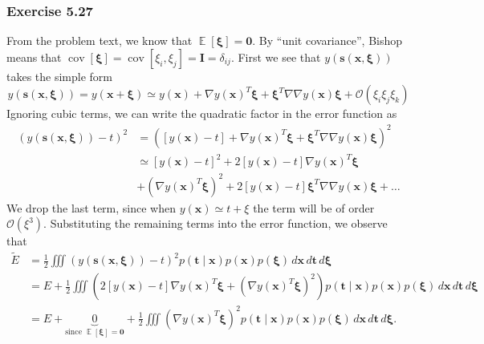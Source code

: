 \documentclass[12pt, a4paper]{article}
\newcommand{\vect}[1]{\bm{#1}}
\DeclareMathOperator{\E}{\mathbb{E}}
\DeclareMathOperator{\cov}{\operatorname{cov}}
\begin{document}
\subsubsection*{Exercise 5.27}
From the problem text, we know that $\E \left[ \vect{\xi}\right] = \vect{0}$.
By ``unit covariance'', Bishop means that $\cov \left[ \vect{\xi}\right] = \cov \left[ \xi_i, \xi_j \right] = \vect{I} =  \delta_{ij}$.
First we see that $y( \vect{s}(\vect{x}, \vect{\xi}) )$ takes the simple form
\begin{equation*}
	y( \vect{s}(\vect{x}, \vect{\xi}) )
	= y( \vect{x} + \vect{\xi} )
	\simeq y( \vect{x}) + \nabla y (\vect{x})^T \vect{\xi}
	+
	\vect{\xi}^T \nabla \nabla y (\vect{x}) \vect{\xi}
	+ \mathcal{O}(\xi_i \xi_j \xi_k)
\end{equation*}
Ignoring cubic terms, we can write the quadratic factor in the error function as
\begin{align*}
	\left( y( \vect{s}(\vect{x}, \vect{\xi}) ) - t \right)^2
	&=
	\left( \left[ y(\vect{x}) - t \right] + \nabla y (\vect{x})^T \vect{\xi} + \vect{\xi}^T \nabla \nabla y (\vect{x}) \vect{\xi} \right)^2 \\
	&\simeq
	\left[ y(\vect{x}) - t \right]^2
	+ 2 \left[ y(\vect{x}) - t \right] \nabla y (\vect{x})^T \vect{\xi}
	\\
	& + \left( \nabla y (\vect{x})^T \vect{\xi} \right)^2
	+ 2 \left[ y(\vect{x}) - t \right] \vect{\xi}^T \nabla \nabla y (\vect{x}) \vect{\xi}
	+ \ldots
\end{align*}
We drop the last term, since when $y(\vect{x}) \simeq t + \xi$ the term will be of order $\mathcal{O}(\xi^3)$.
Substituting the remaining terms into the error function, we observe that
\begin{align*}
	\widetilde{E} &= \frac{1}{2} 
	\iiint  \left( y( \vect{s}(\vect{x}, \vect{\xi}) ) - t \right)^2
	p(\vect{t} \mid \vect{x}) p (\vect{x}) p (\vect{\xi})
	\, d \vect{x} \, d \vect{t} \, d \vect{\xi} \\
	&= 
	E + 
	\frac{1}{2} 
	\iiint  
	\left( 
	2 \left[ y(\vect{x}) - t \right] \nabla y (\vect{x})^T \vect{\xi}
	+ \left( \nabla y (\vect{x})^T \vect{\xi} \right)^2 \right)
	p(\vect{t} \mid \vect{x}) p (\vect{x}) p (\vect{\xi})
	\, d \vect{x} \, d \vect{t} \, d \vect{\xi} \\
	&= 
	E + 
	\underbrace{0}_{\text{since } \E \left[ \vect{\xi}\right] = \vect{0}}
	+
	\frac{1}{2} 
	\iiint  
	\left( \nabla y (\vect{x})^T \vect{\xi} \right)^2 
	p(\vect{t} \mid \vect{x}) p (\vect{x}) p (\vect{\xi})
	\, d \vect{x} \, d \vect{t} \, d \vect{\xi}.
\end{align*}
\end{document}
